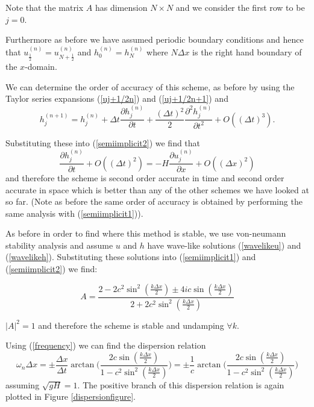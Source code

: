 \documentclass[a4paper,12pt, notitlepage]{article}
\begin{document}
Note that the matrix $A$ has dimension $N \times N$ and we consider the first row to be $j = 0$.

Furthermore as before we have assumed periodic boundary conditions and hence that $u_{\frac{1}{2}}^{(n)} = u_{N + \frac{1}{2}}^{(n)}$ and $h_{0}^{(n)} = h_{N}^{(n)}$ where $N\Delta x$ is the right hand boundary of the $x$-domain. 

We can determine the order of accuracy of this scheme, as before by using the Taylor series expansions (\ref{uj+1/2n}) and (\ref{uj+1/2n+1}) and
\begin{equation}
h_{j}^{(n+ 1)} = h_{j}^{(n)} + \Delta t \frac{\partial h_{j}^{(n)}}{\partial t} + \frac{(\Delta t)^{2}}{2}\frac{\partial^{2} h_{j}^{(n)}}{\partial t^{2}} + O((\Delta t)^{3}).
\end{equation}

Substituting these into (\ref{semiimplicit2}) we find that
\begin{equation}
\frac{\partial h_{j}^{(n)}}{\partial t} + O((\Delta t)^{2}) = - H \frac{\partial u_{j}^{(n)}}{\partial x} + O((\Delta x)^{2}) 
\end{equation}
and therefore the scheme is second order accurate in time and second order accurate in space which is better than any of the other schemes we have looked at so far. (Note as before the same order of accuracy is obtained by performing the same analysis with (\ref{semiimplicit1})).

As before in order to find where this method is stable, we use von-neumann stability analysis and assume $u$ and $h$ have wave-like solutions (\ref{wavelikeu}) and (\ref{wavelikeh}). Substituting these solutions into (\ref{semiimplicit1}) and (\ref{semiimplicit2}) we find:

\begin{equation}
A = \frac{2 - 2c^{2}\sin^{2}(\frac{k\Delta x}{2}) \pm 4ic\sin(\frac{k\Delta x}{2})}{2 + 2 c^{2}\sin^{2}(\frac{k\Delta x}{2})}
\end{equation}

$\lvert A \rvert^{2} = 1$ and therefore the scheme is stable and undamping $\forall k$.

Using (\ref{frequency}) we can find the dispersion relation
\begin{equation}
\omega_{n} \Delta x = \pm\frac{\Delta x}{\Delta t} \arctan\bigg(\frac{2 c \sin(\frac{k\Delta x}{2})}{1 - c^{2} \sin^{2}(\frac{k\Delta x}{2})}\bigg) = \pm\frac{1}{c} \arctan\bigg(\frac{2 c \sin(\frac{k\Delta x}{2})}{1 - c^{2} \sin^{2}(\frac{k\Delta x}{2})}\bigg)
\end{equation}
assuming $\sqrt{gH} = 1$. The positive branch of this dispersion relation is again plotted in Figure \ref{dispersionfigure}. 
\end{document}
